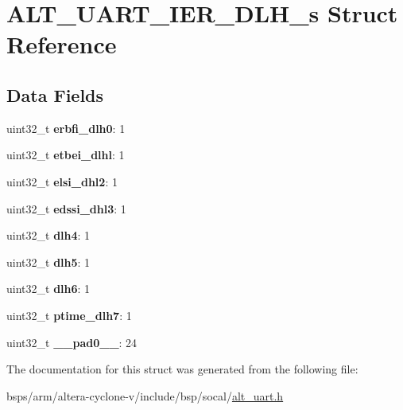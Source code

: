 \hypertarget{structALT__UART__IER__DLH__s}{}\section{A\+L\+T\+\_\+\+U\+A\+R\+T\+\_\+\+I\+E\+R\+\_\+\+D\+L\+H\+\_\+s Struct Reference}
\label{structALT__UART__IER__DLH__s}
\subsection*{Data Fields}
\begin{DoxyCompactItemize}
\item 
\mbox{\label{structALT__UART__IER__DLH__s_ac4aef5de078bb7fe80b8f434be257edf}} 
uint32\+\_\+t {\bfseries erbfi\+\_\+dlh0}\+: 1
\item 
\mbox{\label{structALT__UART__IER__DLH__s_ad8b96d41e87fc39ac46656c88f6f66e6}} 
uint32\+\_\+t {\bfseries etbei\+\_\+dlhl}\+: 1
\item 
\mbox{\label{structALT__UART__IER__DLH__s_aed6a1ee4c36b038b8926615e8cbbb137}} 
uint32\+\_\+t {\bfseries elsi\+\_\+dhl2}\+: 1
\item 
\mbox{\label{structALT__UART__IER__DLH__s_a46419f992b7606d388f7d730935b37b5}} 
uint32\+\_\+t {\bfseries edssi\+\_\+dhl3}\+: 1
\item 
\mbox{\label{structALT__UART__IER__DLH__s_a8552b21820123d09f9e8ad500edd959e}} 
uint32\+\_\+t {\bfseries dlh4}\+: 1
\item 
\mbox{\label{structALT__UART__IER__DLH__s_ac852a358796b83f451e9be58338a0181}} 
uint32\+\_\+t {\bfseries dlh5}\+: 1
\item 
\mbox{\label{structALT__UART__IER__DLH__s_a07cf921d9e5261eaf50bba56a3e39e9e}} 
uint32\+\_\+t {\bfseries dlh6}\+: 1
\item 
\mbox{\label{structALT__UART__IER__DLH__s_a53f0ba63e9d7392a22bfb4eb046c18be}} 
uint32\+\_\+t {\bfseries ptime\+\_\+dlh7}\+: 1
\item 
\mbox{\label{structALT__UART__IER__DLH__s_a302bb959d7f78462c5c9394bcc6ef4f2}} 
uint32\+\_\+t {\bfseries \+\_\+\+\_\+pad0\+\_\+\+\_\+}\+: 24
\end{DoxyCompactItemize}


The documentation for this struct was generated from the following file\+:\begin{DoxyCompactItemize}
\item 
bsps/arm/altera-\/cyclone-\/v/include/bsp/socal/\mbox{\hyperlink{alt__uart_8h}{alt\+\_\+uart.\+h}}\end{DoxyCompactItemize}
